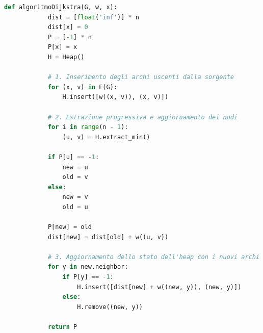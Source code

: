\documentclass[12pt]{report}
\begin{document}
	\begin{lstlisting}[language=Python, caption={Algoritmo di Dijkstra con Min-Heap}]
		def algoritmoDijkstra(G, w, x):
			dist = [float('inf')] * n
			dist[x] = 0
			P = [-1] * n
			P[x] = x
			H = Heap()
			
			# 1. Inserimento degli archi uscenti dalla sorgente
			for (x, v) in E(G):
				H.insert([w((x, v)), (x, v)])
			
			# 2. Estrazione progressiva e aggiornamento dei nodi
			for i in range(n - 1):
				(u, v) = H.extract_min()
			
			if P[u] == -1:
				new = u
				old = v
			else:
				new = v
				old = u
			
			P[new] = old
			dist[new] = dist[old] + w((u, v))
			
			# 3. Aggiornamento dello stato dell'heap con i nuovi archi
			for y in new.neighbor:
				if P[y] == -1:
					H.insert([dist[new] + w((new, y)), (new, y)])
				else:
					H.remove((new, y))
			
			return P
	\end{lstlisting}
	
\end{document}
